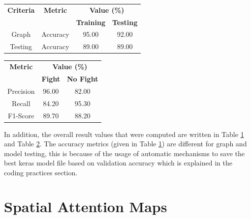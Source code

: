 \begin{table}[!htbp]
\centering
{}
\begin{tabular}{c|c|c|c}
\hline
\textbf{Criteria} & \textbf{Metric} & \multicolumn{2}{c}{\textbf{Value (\%)}} \\
\cline{3-4}
           &                  & \textbf{Training}    & \textbf{Testing} \\ \hline
Graph     & Accuracy          & 95.00                & 92.00               \\
Testing   & Accuracy          & 89.00                   & 89.00                \\
\hline
\end{tabular}

\label{table:trainingTestingAccMetric}
\end{table}


\vspace{1.5cm}

\begin{table}[!htbp]
\centering
{}
\begin{tabular}{c|c|c}
\hline
\textbf{Metric} & \multicolumn{2}{c}{\textbf{Value (\%)}} \\
\cline{2-3}
                & \textbf{Fight}    & \textbf{No Fight} \\
\hline
Precision       & 96.00             & 82.00                \\
Recall          & 84.20             & 95.30              \\
F1-Score        & 89.70             & 88.20              \\
\hline
\end{tabular}

\label{table:otherMetrics}
\end{table}

\vspace{0.5cm}

\noindent In addition, the overall result values that were computed are written in Table \ref{table:trainingTestingAccMetric} and Table \ref{table:otherMetrics}. The accuracy metrics (given in Table \ref{table:trainingTestingAccMetric}) are different for graph and model testing, this is because of the usage of automatic mechanisms to save the best keras model file based on validation accuracy which is explained in the coding practices section.

\clearpage

\section{Spatial Attention Maps}

